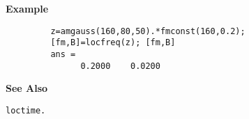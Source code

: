\vspace*{1cm}

{\bf \large \sf Example}
\begin{verbatim}
         z=amgauss(160,80,50).*fmconst(160,0.2);
         [fm,B]=locfreq(z); [fm,B]
         ans = 
               0.2000    0.0200
\end{verbatim}
\vspace*{.5cm}


{\bf \large \sf See Also}\\
\hspace*{1.5cm}
\begin{minipage}[t]{13.5cm}
\begin{verbatim}
loctime.
\end{verbatim}
\end{minipage}




